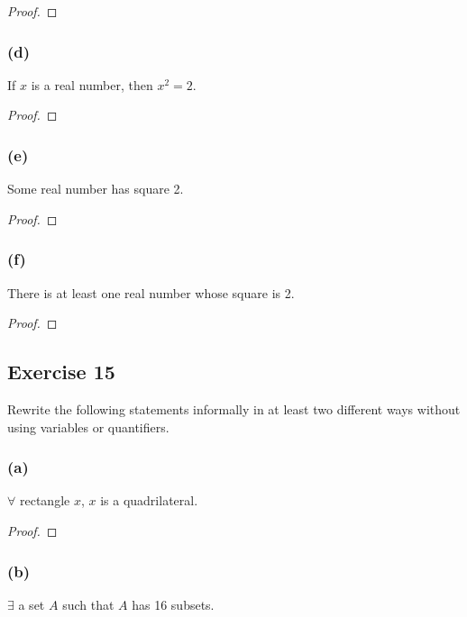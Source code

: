 \documentclass[14pt]{extarticle}
\newcommand{\fa}{\forall}
\newcommand{\te}{\exists}
\begin{document}
\begin{proof}

\end{proof}

\subsubsection{(d)}
If $x$ is a real number, then $x^2 = 2$.

\begin{proof}

\end{proof}

\subsubsection{(e)}
Some real number has square 2.

\begin{proof}

\end{proof}

\subsubsection{(f)}
There is at least one real number whose square is 2.

\begin{proof}

\end{proof}

\subsection{Exercise 15}
Rewrite the following statements informally in at least two different ways without using variables or quantifiers.

\subsubsection{(a)}
$\fa$ rectangle $x$, $x$ is a quadrilateral.

\begin{proof}

\end{proof}

\subsubsection{(b)}
$\te$ a set $A$ such that $A$ has 16 subsets.
\end{document}
